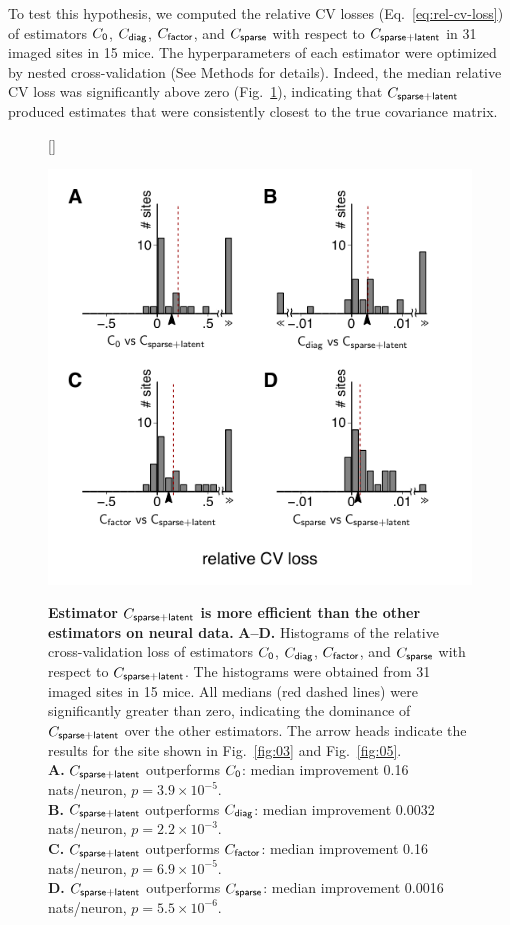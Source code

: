 \documentclass[10pt]{article}
\begin{document}
To test this hypothesis, we computed the relative CV losses (Eq.~\ref{eq:rel-cv-loss}) of estimators  $C_{\sf 0}$, $C_{\sf diag}$, $C_{\sf factor}$, and $C_{\sf sparse}$ with respect to $C_{\sf sparse+latent}$ in 31 imaged sites in 15 mice.  The hyperparameters of each estimator were optimized by nested cross-validation (See Methods for details). Indeed, the median relative CV loss was significantly above zero (Fig.~\ref{fig:04}), indicating that $C_{\sf sparse+latent}$ produced estimates that were consistently closest to the true covariance matrix.
\begin{figure}[!ht]    [\FBwidth]
    {\caption{{\bf Estimator $C_{\sf sparse+latent}$ is more efficient than the other estimators on neural data.}
    {\bf A--D.} Histograms of the relative cross-validation loss of estimators $C_{\sf 0}$, $C_{\sf diag}$, $C_{\sf factor}$, and $C_{\sf sparse}$ with respect to $C_{\sf sparse+latent}$.
    The histograms were obtained from 31 imaged sites in 15 mice. 
    All medians (red dashed lines) were significantly greater than zero, indicating the dominance of $C_{\sf sparse+latent}$ over the other estimators. 
    The arrow heads indicate the results for the site shown in Fig.~\ref{fig:03} and Fig.~\ref{fig:05}.
\\{\bf A.} $C_{\sf sparse+latent}$ outperforms $C_{\sf 0}$: median improvement 0.16 nats/neuron, $p=3.9\times 10^{-5}$.
\\{\bf B.} $C_{\sf sparse+latent}$ outperforms $C_{\sf diag}$: median improvement 0.0032 nats/neuron, $p=2.2\times 10^{-3}$.
\\{\bf C.} $C_{\sf sparse+latent}$ outperforms $C_{\sf factor}$: median improvement 0.16 nats/neuron, $p=6.9\times 10^{-5}$.
\\{\bf D.} $C_{\sf sparse+latent}$ outperforms $C_{\sf sparse}$: median improvement 0.0016 nats/neuron, $p=5.5\times 10^{-6}$.
} \label{fig:04}}
    {\includegraphics{./figures/Figure04.pdf}}
\end{figure}
\end{document}
